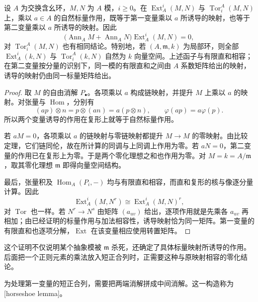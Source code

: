 \begin{proposition}\label{g5:prop:ext-annihilator}
	设 \(A\) 为交换含幺环，\(M,N\) 为 \(A\) 模，\(i\geq0\)。在
	\(\operatorname{Ext}^i_A(M,N)\) 与 \(\operatorname{Tor}_i^A(M,N)\) 上，乘以 \(a\in A\) 的自然标量作用，既等于第一变量乘以 \(a\) 所诱导的映射，也等于第二变量乘以 \(a\) 所诱导的映射。因此
	\[
		\bigl(\operatorname{Ann}_A M+\operatorname{Ann}_A N\bigr)
		\operatorname{Ext}^i_A(M,N)=0,
	\]
	对 \(\operatorname{Tor}_i^A(M,N)\) 也有相同结论。特别地，若 \((A,\mathfrak m,k)\) 为局部环，则全部 \(\operatorname{Ext}^i_A(k,N)\) 与 \(\operatorname{Tor}_i^A(k,N)\) 自然为 \(k\) 向量空间。上述函子与有限直和相容；在第二变量按分量的识别下，同一模的有限直和之间由 \(A\) 系数矩阵给出的映射，诱导的映射仍由同一标量矩阵给出。
\end{proposition}
\begin{proof}
	取 \(M\) 的自由消解 \(P_\bullet\)。各项乘以 \(a\) 构成链映射，并提升 \(M\) 上乘以 \(a\) 的映射。对张量与 \(\operatorname{Hom}\)，分别有
	\[
		(ap)\otimes n=p\otimes(an)=a(p\otimes n),\qquad
		\varphi(ap)=a\varphi(p).
	\]
	所以两个变量诱导的作用在复形上就等于自然标量作用。

	若 \(aM=0\)，各项乘以 \(a\) 的链映射与零链映射都提升 \(M\to M\) 的零映射。由比较定理，它们链同伦，故在所计算的同调与上同调上作用为零。若 \(aN=0\)，第二变量的作用已在复形上为零。于是两个零化理想之和也作用为零。对 \(M=k=A/\mathfrak m\)，取其零化理想 \(\mathfrak m\) 即得向量空间结构。

	最后，张量积及 \(\operatorname{Hom}_A(P_i,-)\) 均与有限直和相容，而直和复形的核与像逐分量计算。因此
	\[
		\operatorname{Ext}^i_A(M,N^r)
		\cong\operatorname{Ext}^i_A(M,N)^r,
	\]
	对 \(\operatorname{Tor}\) 也一样。若 \(N^r\to N^s\) 由矩阵 \((a_{uv})\) 给出，逐项作用就是先乘各 \(a_{uv}\) 再相加；由已经证明的标量作用与加法相容性，诱导映射恰为同一矩阵。第一变量的有限直和也逐项分解，\(\operatorname{Ext}\) 在该变量相应使用转置矩阵。
\end{proof}

这个证明不仅说明某个抽象模被 \(\mathfrak m\) 杀死，还确定了具体标量映射所诱导的作用。后面把一个正则元素的乘法放入短正合列时，正需要这种与原映射相容的零化结论。

\ProseParagraphBreak

为处理第一变量的短正合列，需要把两端消解拼成中间消解。这一构造称为[horseshoe lemma]。

